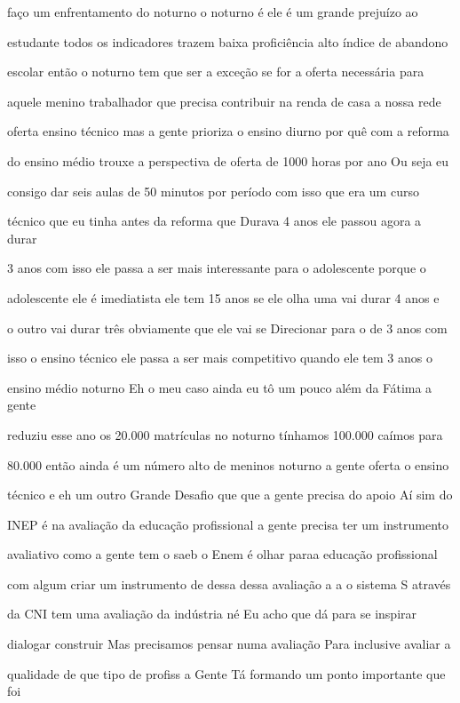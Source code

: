 \documentclass[a4paper,12pt]{article}
\begin{document}
faço um enfrentamento do noturno o noturno é ele é um grande prejuízo ao

estudante todos os indicadores trazem baixa proficiência alto índice de abandono

escolar então o noturno tem que ser a exceção se for a oferta necessária para

aquele menino trabalhador que precisa contribuir na renda de casa a nossa rede

oferta ensino técnico mas a gente prioriza o ensino diurno por quê com a reforma

do ensino médio trouxe a perspectiva de oferta de 1000 horas por ano Ou seja eu

consigo dar seis aulas de 50 minutos por período com isso que era um curso

técnico que eu tinha antes da reforma que Durava 4 anos ele passou agora a durar

3 anos com isso ele passa a ser mais interessante para o adolescente porque o

adolescente ele é imediatista ele tem 15 anos se ele olha uma vai durar 4 anos e

o outro vai durar três obviamente que ele vai se Direcionar para o de 3 anos com

isso o ensino técnico ele passa a ser mais competitivo quando ele tem 3 anos o

ensino médio noturno Eh o meu caso ainda eu tô um pouco além da Fátima a gente

reduziu esse ano os 20.000 matrículas no noturno tínhamos 100.000 caímos para

80.000 então ainda é um número alto de meninos noturno a gente oferta o ensino

técnico e eh um outro Grande Desafio que que a gente precisa do apoio Aí sim do

INEP é na avaliação da educação profissional a gente precisa ter um instrumento

avaliativo como a gente tem o saeb o Enem é olhar paraa educação profissional

com algum criar um instrumento de dessa dessa avaliação a a o sistema S através

da CNI tem uma avaliação da indústria né Eu acho que dá para se inspirar

dialogar construir Mas precisamos pensar numa avaliação Para inclusive avaliar a

qualidade de que tipo de profiss a Gente Tá formando um ponto importante que foi
\end{document}
